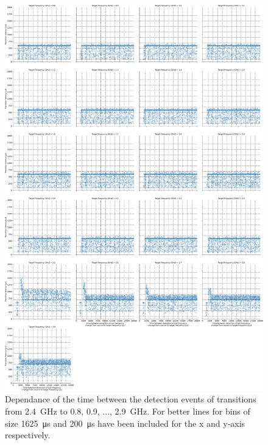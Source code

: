 \begin{figure}[]
    \centering
    \includegraphics[width=\columnwidth]{fig/ftalat_scatter_wait_transition_latency_hati_source_2.4.pdf}
    \caption{Dependance of the time between the detection events of transitions from \SI{2.4}{\GHz} to \SI{0.8}{}, \SI{0.9}{}, ..., \SI{2.9}{\GHz}. For better lines for bins of size \SI{1625}{\us} and \SI{200}{\us} have been included for the x and y-axis respectively.}
\end{figure}

